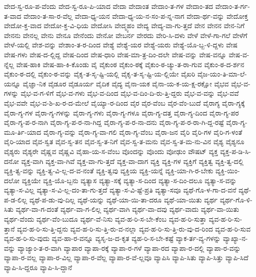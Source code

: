 {ವೇದ-ಸ್ವ-ರೂ-ಪ-ವೆಂದು
ವೇದ-ಸ್ವ-ರೂ-ಪಿ-ಯಾದ
ವೇದಾ
ವೇದಾಂತ
ವೇದಾಂ-ತ-ಗಳ
ವೇದಾಂ-ತದ
ವೇದಾಂ-ತ-ರ್ಗ-ತ-ವಾದ
ವೇದಾಂ-ತ-ಸಾ-ರ-ವೆಲ್ಲ
ವೇದಾ-ಧ್ಯ-ಯನ
ವೇದಾ-ಧ್ಯ-ಯ-ನ-ಸಂ-ಪ-ನ್ನ-ನಾಗ
ವೇದಾ-ರ್ಥ-ವನ್ನು
ವೇದೋಕ್ತ
ವೇದೋ-ಕ್ತ-ವಾದ
ವೇದೋ-ಕ್ತ-ವಿ-ಧಿಯ
ವೇದೋಸಿ
ವೇದ್ಮ್ಯಹಂ
ವೇದ್ಯ
ವೇದ್ಯ-ವಾ-ಗು-ತ್ತದೆ
ವೇನ
ವೇನನ
ವೇನ-ನಿಗೆ
ವೇನನು
ವೇನಲ್ಲ
ವೇನು
ವೇನೂ
ವೇನೆಂದು
ವೇನೋ
ವೇಬರ್ನ
ವೇರದು
ವೇರಿ-ಸಿ-ದಳು
ವೇಳೆ
ವೇಳೆ-ಗಾ-ಗಲೆ
ವೇಳೆಗೆ
ವೇಳೆ-ಯಲ್ಲಿ
ವೇಶ-ವನ್ನು
ವೇಶಾಂ-ತ-ರ-ದಿಂದ
ವೇಶ್ಯೆ
ವೇಶ್ಯೆ-ಯರ
ವೇಶ್ಯೆ-ಯರು
ವೇಶ್ಯೆ-ಯೊ-ಬ್ಬ-ಳಿ-ದ್ದಳು
ವೇಷ
ವೇಷ-ಗಳು
ವೇಷ-ದ-ಲ್ಲಿದ್ದ
ವೇಷ-ದಿಂದ
ವೇಷ-ಧಾರಿ
ವೇಷ-ಮಾ-ತ್ರ-ದಿಂ-ದಲೇ
ವೇಷ-ವನ್ನು
ವೇಷ-ವನ್ನೂ
ವೇಷ-ವ-ನ್ನೆಲ್ಲ
ವೇಷ-ಹಾಕಿ
ವೇಷ-ಹಾ-ಕಿ-ಕೊಂಡು
ವೈ
ವೈಕುಂಠ
ವೈಕುಂ-ಠಕ್ಕೆ
ವೈಕುಂ-ಠ-ಚ್ಯು-ತ-ರಾ-ಗುವ
ವೈಕುಂ-ಠ-ದ-ರ್ಶನ
ವೈಕುಂ-ಠ-ದಲ್ಲಿ
ವೈಕುಂ-ಠ-ವನ್ನು
ವೈಕೃ-ತ-ಸೃ-ಷ್ಟಿ-ಯಲ್ಲಿ
ವೈಕೃ-ತ-ಸೃ-ಷ್ಟಿ-ಯ-ಲ್ಲಿಯೇ
ವೈಖರಿ
ವೈಜ-ಯಂ-ತಿ-ಮಾ-ಲೆ-ಯನ್ನೂ
ವೈಜ್ಞಾ-ನಿಕ
ವೈಡೂರ
ವೈಡೂರ್ಯ
ವೈದಿಕ
ವೈದ್ಯ
ವೈನಾ-ಯಕ
ವೈನಾ-ಯ-ಕ-ಯ-ಕ್ಷ-ರಕ್ಷೋ
ವೈಭವ
ವೈಭ-ವ-ಗಳನ್ನು
ವೈಭ-ವ-ಗ-ಳಿಗೆ
ವೈಭ-ವ-ಗಳು
ವೈಭ-ವ-ದಿಂದ
ವೈಭ-ವ-ದಿಂ-ದಿ-ರು-ತ್ತಿ-ದ್ದರು
ವೈಭ-ವ-ವನ್ನು
ವೈಭ-ವವೆ
ವೈಭ-ವವೇ
ವೈಭ-ವ-ಶಿ-ಖ-ರ-ದ-ಮೇಲೆ
ವೈಯ್ಯಾ-ರ-ದಿಂದ
ವೈರ
ವೈರ-ವೆಂಬ
ವೈರ-ವೆಂ-ಬುದೆ
ವೈರಾಗ್ಯ
ವೈರಾ-ಗ್ಯಕ್ಕೆ
ವೈರಾ-ಗ್ಯ-ಗಳ
ವೈರಾ-ಗ್ಯ-ಗಳನ್ನು
ವೈರಾ-ಗ್ಯ-ಗಳು
ವೈರಾ-ಗ್ಯ-ಗಳೂ
ವೈರಾ-ಗ್ಯ-ದತ್ತ
ವೈರಾ-ಗ್ಯ-ದಿಂದ
ವೈರಾ-ಗ್ಯ-ಪರ
ವೈರಾ-ಗ್ಯ-ಪ-ರ-ನಾಗಿ
ವೈರಾ-ಗ್ಯ-ಪ-ರ-ನಾ-ಗಿದ್ದ
ವೈರಾ-ಗ್ಯ-ಪ-ರ-ನಾ-ದನು
ವೈರಾ-ಗ್ಯ-ಪ-ರ-ರಾ-ಗಿ-ದ್ದ-ರಷ್ಟೆ
ವೈರಾ-ಗ್ಯ-ಮೂ-ರ್ತಿ-ಯಾದ
ವೈರಾ-ಗ್ಯ-ವನ್ನು
ವೈರಾ-ಗ್ಯ-ವಾ-ಗಲಿ
ವೈರಾ-ಗ್ಯ-ವೆಂಬ
ವೈರಾ-ಜನ
ವೈರಿ
ವೈರಿ-ಗಳ
ವೈರಿ-ಗ-ಳಂತೆ
ವೈರಿ-ಯಾದ
ವೈವ-ಸ್ವತ
ವೈವ-ಸ್ವ-ತನ
ವೈವ-ಸ್ವ-ತ-ನಿಗೆ
ವೈವ-ಸ್ವ-ತ-ಮನು
ವೈವ-ಸ್ವ-ತ-ಮ-ನು-ವಿನ
ವೈಶ್ಯ
ವೈಶ್ಯನೂ
ವೈಶ್ಯರು
ವೈಶ್ಯರೇ
ವೈಷ್ಣವ
ವೈಷ್ಣವಿ
ವೈಹಾ-ಯ-ಸ-ವೆಂಬ
ವೊಂದನ್ನು
ವೊಂದು
ವೋಢುಂ
ವೌಷಟ್
ವ್ಯಕ್ತ
ವ್ಯಕ್ತ-ಪ-ಡಿ-ಸಿ-ದನೋ
ವ್ಯಕ್ತ-ವಾಗಿ
ವ್ಯಕ್ತ-ವಾ-ಗಿವೆ
ವ್ಯಕ್ತ-ವಾ-ಗು-ತ್ತದೆ
ವ್ಯಕ್ತ-ವಾ-ದಾಗ
ವ್ಯಕ್ತಿ
ವ್ಯಕ್ತಿ-ಗಳ
ವ್ಯಕ್ತಿಗೆ
ವ್ಯಕ್ತಿತ್ವ
ವ್ಯಕ್ತಿ-ತ್ವ-ದಲ್ಲಿ
ವ್ಯಕ್ತಿ-ತ್ವ-ವನ್ನು
ವ್ಯಕ್ತಿ-ತ್ವ-ವಿ-ಲ್ಲ-ದ-ವ-ನಂತೆ
ವ್ಯಕ್ತಿ-ತ್ವವು
ವ್ಯಕ್ತಿಯ
ವ್ಯಕ್ತಿ-ಯನ್ನೆ
ವ್ಯಕ್ತಿ-ಯಾ-ಗಿ-ರ-ಬೇಕು
ವ್ಯಕ್ತಿ-ಯಿಂ-ದಲೋ
ವ್ಯಕ್ತಿಯೇ
ವ್ಯಕ್ತಿ-ಯೊ-ಬ್ಬನು
ವ್ಯತ್ಯಾಸ
ವ್ಯತ್ಯಾ-ಸಕ್ಕೆ
ವ್ಯತ್ಯಾ-ಸ-ದಿಂದ
ವ್ಯತ್ಯಾ-ಸ-ದಿಂ-ದಲೂ
ವ್ಯತ್ಯಾ-ಸ-ವನ್ನು
ವ್ಯತ್ಯಾ-ಸ-ವಿಲ್ಲ
ವ್ಯತ್ಯಾ-ಸ-ವಿ-ಲ್ಲ-ದಂ-ತಾ-ಗು-ತ್ತದೆ
ವ್ಯತ್ಯಾ-ಸ-ವಿ-ಷ್ಟೆ-ಪ್ರತಿ
ವ್ಯತ್ಯಾ-ಸವೂ
ವ್ಯಥೆ-ಗೊ-ಳ-ಗಾ-ದ-ವನೆ
ವ್ಯಥೆ-ಪ-ಡ-ಲಿಲ್ಲ
ವ್ಯಥೆ-ಪ-ಡು-ವು-ದಿಲ್ಲ
ವ್ಯಥೆ-ಯನ್ನು
ವ್ಯಥೆ-ಯಾ-ಯಿ-ತಾ-ದರೂ
ವ್ಯಥೆ-ಯಾ-ಯಿತು
ವ್ಯರ್ಥ
ವ್ಯರ್ಥ-ಗೊ-ಳಿ-ಸಿತು
ವ್ಯರ್ಥ-ವಾ-ಗ-ದಂತೆ
ವ್ಯರ್ಥ-ವಾ-ಗ-ಲಿಲ್ಲ
ವ್ಯರ್ಥ-ವಾಗಿ
ವ್ಯರ್ಥ-ವಾ-ದವು
ವ್ಯರ್ಥ-ವಾದು
ವ್ಯರ್ಥ-ವಾ-ಯಿತು
ವ್ಯರ್ಥ-ವೆಂದು
ವ್ಯರ್ಥ-ವೆಂ-ಬುದೂ
ವ್ಯರ್ಥ-ವೆ-ನಿಸು
ವ್ಯವ-ಹ-ರಿ-ಸ-ಬೇ-ಕೆಂಬ
ವ್ಯವ-ಹ-ರಿ-ಸುತ್ತಾ
ವ್ಯವ-ಹ-ರಿ-ಸು-ತ್ತಾನೆ
ವ್ಯವ-ಹ-ರಿ-ಸು-ತ್ತಿ-ದ್ದನು
ವ್ಯವ-ಹ-ರಿ-ಸು-ತ್ತಿ-ರು-ವ-ನಲ್ಲಾ
ವ್ಯವ-ಹ-ರಿ-ಸು-ತ್ತಿ-ರು-ವು-ದ-ರಿಂದ
ವ್ಯವ-ಹ-ರಿ-ಸುವ
ವ್ಯವ-ಹ-ರಿ-ಸು-ವುದು
ವ್ಯವ-ಹಾ-ರ-ವನ್ನೂ
ವ್ಯಸೃ-ಜ-ದ-ಕೃತ
ವ್ಯಹ-ರಿ-ಸ-ಬೇ-ಕಷ್ಟೆ
ವ್ಯಾಕ-ರ್ತ-ವ್ಯ-ಗಳನ್ನು
ವ್ಯಾಖ್ಯಾ-ನ-ವನ್ನು
ವ್ಯಾಜ್ಯಾಂ-ತ-ರ-ವಾಗಿ
ವ್ಯಾಪಾರ
ವ್ಯಾಪಾ-ರಕ್ಕೆ
ವ್ಯಾಪಾ-ರ-ಗಳೆ
ವ್ಯಾಪಾ-ರದ
ವ್ಯಾಪಾ-ರ-ದಲ್ಲಿ
ವ್ಯಾಪಾ-ರ-ವನ್ನು
ವ್ಯಾಪಾ-ರ-ವಲ್ಲ
ವ್ಯಾಪಾ-ರ-ವಿಲ್ಲ
ವ್ಯಾಪಾ-ರ-ವೆಲ್ಲ
ವ್ಯಾಪಾ-ರ-ವೆ-ಲ್ಲವೂ
ವ್ಯಾಪಿಸಿ
ವ್ಯಾಪಿ-ಸಿತು
ವ್ಯಾಪಿ-ಸಿತ್ತು
ವ್ಯಾಪಿ-ಸಿದೆ
ವ್ಯಾಪಿ-ಸಿ-ದ್ದರೂ
ವ್ಯಾಪಿ-ಸಿ-ದ್ದಾನೆ
}
